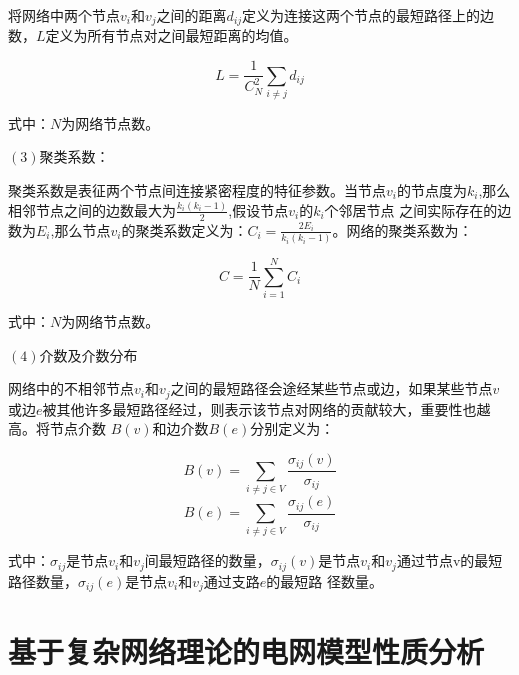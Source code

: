 将网络中两个节点$v_i$和$v_j$之间的距离$d_{ij}$定义为连接这两个节点的最短路径上的边数，$L$定义为所有节点对之间最短距离的均值。

\begin{equation}
    \label{equ:chap3:feature}
    L=\frac{1}{C_N^2} \sum_{i \neq j} d_{i j}
\end{equation}

式中：$N$为网络节点数。

$(3)$聚类系数：

聚类系数是表征两个节点间连接紧密程度的特征参数。当节点$v_i$的节点度为$k_i$,那么相邻节点之间的边数最大为$\frac{k_i(k_i-1)}{2}$,假设节点$v_i$的$k_i$个邻居节点
之间实际存在的边数为$E_i$,那么节点$v_i$的聚类系数定义为：$C_i=\frac{2E_i}{k_i(k_i-1)}$。网络的聚类系数为：

\begin{equation} 
    \label{equ:chap3:feature}
    C=\frac{1}{N} \sum_{i=1}^N C_i
\end{equation}

式中：$N$为网络节点数。

$(4)$介数及介数分布

网络中的不相邻节点$v_i$和$v_j$之间的最短路径会途经某些节点或边，如果某些节点$v$或边$e$被其他许多最短路径经过，则表示该节点对网络的贡献较大，重要性也越高。将节点介数
$B(v)$和边介数$B(e)$分别定义为：

\begin{equation} 
    \label{equ:chap3:feature}
    B(v)=\sum_{i \neq j\in V} \frac{\sigma_{ij}(v)}{\sigma_{ij}} 
\end{equation}
\begin{equation} 
    \label{equ:chap3:feature}
    B(e)=\sum_{i \neq j\in V} \frac{\sigma_{ij}(e)}{\sigma_{ij}} 
\end{equation}

式中：$\sigma_{ij}$是节点$v_i$和$v_j$间最短路径的数量，$\sigma_{ij}(v)$是节点$v_i$和$v_j$通过节点v的最短路径数量，$\sigma_{ij}(e)$是节点$v_i$和$v_j$通过支路$e$的最短路
径数量。

\section{基于复杂网络理论的电网模型性质分析}
\label{sec:complexGrid}

